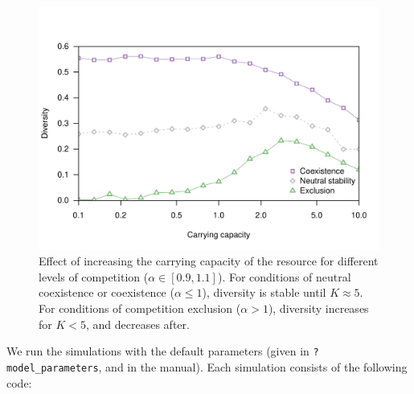 \documentclass[12pt]{article}
\begin{document}
\begin{figure}[bt]
    \centering
    \includegraphics[width=\columnwidth]{figures/carryingcapacity.pdf}
    \caption[Effect of varying the carrying capacity.]{Effect of increasing the carrying capacity of the resource for different levels of competition ($\alpha \in \left[0.9, 1.1\right]$). For conditions of neutral coexistence or coexistence ($\alpha \leq 1$), diversity is stable until $K \approx 5$. For conditions of competition exclusion ($\alpha > 1$), diversity increases for $K < 5$, and decreases after.}
    \label{carrying}
\end{figure}

We run the simulations with the default parameters (given in
\texttt{?model\_parameters}, and in the manual). Each simulation
consists of the following code:
\end{document}
